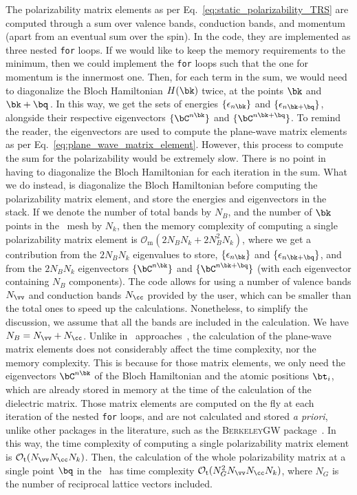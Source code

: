 The polarizability matrix elements as per Eq.~\eqref{eq:static_polarizability_TRS} are computed through a sum over valence bands, conduction bands, and momentum (apart from an eventual sum over the spin).
In the code, they are implemented as three nested \texttt{for} loops.
If we would like to keep the memory requirements to the minimum, then we could implement the \texttt{for} loops such that the one for momentum is the innermost one.
Then, for each term in the sum, we would need to diagonalize the Bloch Hamiltonian $H(\bk)$ twice, at the points $\bk$ and $\bk+\bq$\,.
In this way, we get the sets of energies $\{\epsilon_{n \bk}\}$ and $\{\epsilon_{n \bk+\bq}\}$, alongside their respective eigenvectors $\{\bC^{n\bk}\}$ and $\{\bC^{n\bk+\bq}\}$.
To remind the reader, the eigenvectors are used to compute the plane-wave matrix elements as per Eq.~\eqref{eq:plane_wave_matrix_element}.
However, this process to compute the sum for the polarizability would be extremely slow.
There is no point in having to diagonalize the Bloch Hamiltonian for each iteration in the sum.
What we do instead, is diagonalize the Bloch Hamiltonian before computing the polarizability matrix element, and store the energies and eigenvectors in the stack.
If we denote the number of total bands by $N_{B}$, and the number of $\bk$ points in the \bz~mesh by $N_{k}$, then the memory complexity of computing a single polarizability matrix element is $\mathcal{O}_{\mathrm{m}}( 2 N_{B} N_{k} + 2 N_{B}^2 N_{k})$, where we get a contribution from the $2 N_{B} N_{k}$ eigenvalues to store, $\{\epsilon_{n \bk}\}$ and $\{\epsilon_{n \bk+\bq}\}$, and from the $2 N_{B} N_{k}$ eigenvectors $\{\bC^{n\bk}\}$ and $\{\bC^{n\bk+\bq}\}$ (with each eigenvector containing $N_{B}$ components).
The code allows for using a number of valence bands $N_{\vv}$ and conduction bands $N_{\cc}$ provided by the user, which can be smaller than the total ones to speed up the calculations.
Nonetheless, to simplify the discussion, we assume that all the bands are included in the calculation.
We have $N_{B} = N_{\vv} + N_{\cc}$.
Unlike in \abinit~approaches~\cite{BerkeleyGW,GPAW_2025,Yambo_2009}, the calculation of the plane-wave matrix elements does not considerably affect the time complexity, nor the memory complexity.
This is because for those matrix elements, we only need the eigenvectors $\bC^{n \bk}$ of the Bloch Hamiltonian and the atomic positions $\bt_i$, which are already stored in memory at the time of the calculation of the dielectric matrix.
Those matrix elements are computed on the fly at each iteration of the nested \texttt{for} loops, and are not calculated and stored \textit{a priori}, unlike other packages in the literature, such as the \textsc{BerkeleyGW} package~\cite{BerkeleyGW}.
In this way, the time complexity of computing a single polarizability matrix element is $\mathcal{O}_{\mathrm{t}} (N_{\vv} N_{\cc} N_{k})$.
Then, the calculation of the whole polarizability matrix at a single point $\bq$ in the \bz~has time complexity $\mathcal{O}_{\mathrm{t}} (N_{G}^2 N_{\vv} N_{\cc} N_{k})$, where $N_{G}$ is the number of reciprocal lattice vectors included.


